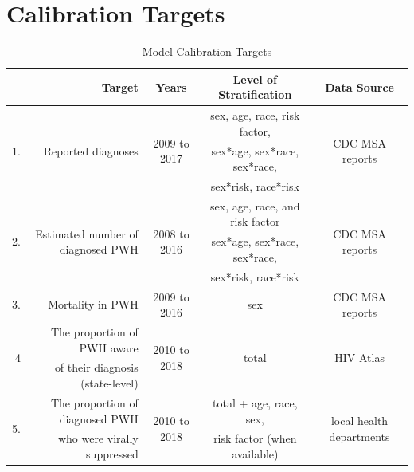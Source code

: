 \documentclass{article}
\begin{document}

\newpage
\section{Calibration Targets}

\begin{table}[H]
	\caption{Model Calibration Targets}
	\small
	\begin{tabular}{r r c c c}
		\hline
		& \textbf{Target} & \textbf{Years} & \textbf{Level of Stratification} & \textbf{Data Source} \\
		\hline
		\hline
		
		\multirow{3}{*}{1.} & \multirow{3}{*}{Reported diagnoses} & \multirow{3}{*}{2009 to 2017} & sex, age, race, risk factor, & \multirow{3}{*}{CDC MSA reports \cite{hivatlas,msa2010,msa2011,msa2013,msa2014,msa2015,msa2016,cdc24.2} }\\
		& & & sex*age, sex*race, sex*race, & \\
		& & & sex*risk, race*risk & \\
		\hline
		
		\multirow{3}{*}{2.} & \multirow{3}{*}{Estimated number of diagnosed PWH} & \multirow{3}{*}{2008 to 2016} & sex, age, race, and risk factor & \multirow{3}{*}{CDC MSA reports \cite{hivatlas,msa2010,msa2011,msa2013,msa2014,msa2015,msa2016,cdc24.2} }\\
		& & & sex*age, sex*race, sex*race, & \\
		& & & sex*risk, race*risk & \\
		\hline
		
		3. & Mortality in PWH & 2009 to 2016 & sex & CDC MSA reports  \cite{msa2010,msa2011,msa2013,msa2014,msa2015,msa2016,cdc24.2} \\
		\hline
		
		\multirow{2}{*}{4}. & The proportion of PWH aware & \multirow{2}{*}{2010 to 2018} & \multirow{2}{*}{total} & \multirow{2}{*}{HIV Atlas \cite{hivatlas} }\\
		& of their diagnosis (state-level) & & & \\
		\hline
		
		\multirow{2}{*}{5.} & The proportion of diagnosed PWH & \multirow{2}{*}{2010 to 2018} & total + age, race, sex, & \multirow{2}{*}{local health departments} \\
		& who were virally suppressed & & risk factor (when available) & \\
		\hline
		

\end{tabular}
\end{table}
\end{document}
